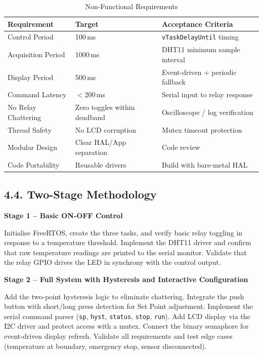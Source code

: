 \documentclass[12pt]{article}
\begin{document}
\begin{table}[H]
    \centering
    \caption{Non-Functional Requirements}
    \label{tab:non-functional-requirements}
    \begin{tabular}{|l|l|l|}
        \hline
        \textbf{Requirement} & \textbf{Target} & \textbf{Acceptance Criteria} \\
        \hline
        Control Period & 100\,ms & \texttt{vTaskDelayUntil} timing \\
        \hline
        Acquisition Period & 1000\,ms & DHT11 minimum sample interval \\
        \hline
        Display Period & 500\,ms & Event-driven + periodic fallback \\
        \hline
        Command Latency & $<$200\,ms & Serial input to relay response \\
        \hline
        No Relay Chattering & Zero toggles within deadband & Oscilloscope / log verification \\
        \hline
        Thread Safety & No LCD corruption & Mutex timeout protection \\
        \hline
        Modular Design & Clear HAL/App separation & Code review \\
        \hline
        Code Portability & Reusable drivers & Build with bare-metal HAL \\
        \hline
    \end{tabular}
\end{table}

\subsection*{4.4. Two-Stage Methodology}

\textbf{Stage 1 – Basic ON-OFF Control}

Initialise FreeRTOS, create the three tasks, and verify basic relay toggling in
response to a temperature threshold. Implement the DHT11 driver and confirm that raw
temperature readings are printed to the serial monitor. Validate that the relay
GPIO drives the LED in synchrony with the control output.

\textbf{Stage 2 – Full System with Hysteresis and Interactive Configuration}

Add the two-point hysteresis logic to eliminate chattering. Integrate the push
button with short/long press detection for Set Point adjustment. Implement the
serial command parser (\texttt{sp}, \texttt{hyst}, \texttt{status}, \texttt{stop},
\texttt{run}). Add LCD display via the I2C driver and protect access with a mutex.
Connect the binary semaphore for event-driven display refresh. Validate all
requirements and test edge cases (temperature at boundary, emergency stop, sensor
disconnected).
\end{document}
